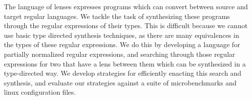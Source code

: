 The language of lenses expresses programs which can convert between source and
target regular languages.
We tackle the task of synthesizing these programs through the regular expressions
of their types.
This is difficult because we cannot use basic type directed synthesis techniques,
as there are many equivalences in the types of these regular expressions.
We do this by developing a language for partially normalized regular expressions,
and searching through those regular expressions for two that have a lens between
them which can be synthesized in a type-directed way.
We develop strategies for efficiently enacting this search and synthesis,
and evaluate our strategies against a suite of microbenchmarks and linux
configuration files.
